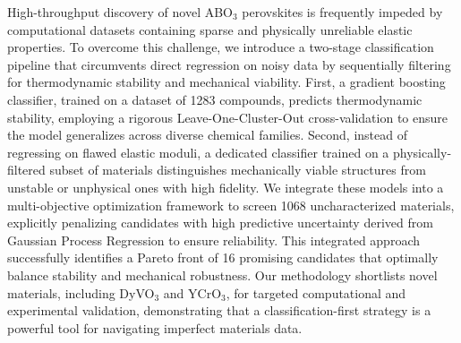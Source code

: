 \documentclass[]{article}
\begin{document}
High-throughput discovery of novel ABO$_3$ perovskites is frequently impeded by computational datasets containing sparse and physically unreliable elastic properties. To overcome this challenge, we introduce a two-stage classification pipeline that circumvents direct regression on noisy data by sequentially filtering for thermodynamic stability and mechanical viability. First, a gradient boosting classifier, trained on a dataset of 1283 compounds, predicts thermodynamic stability, employing a rigorous Leave-One-Cluster-Out cross-validation to ensure the model generalizes across diverse chemical families. Second, instead of regressing on flawed elastic moduli, a dedicated classifier trained on a physically-filtered subset of materials distinguishes mechanically viable structures from unstable or unphysical ones with high fidelity. We integrate these models into a multi-objective optimization framework to screen 1068 uncharacterized materials, explicitly penalizing candidates with high predictive uncertainty derived from Gaussian Process Regression to ensure reliability. This integrated approach successfully identifies a Pareto front of 16 promising candidates that optimally balance stability and mechanical robustness. Our methodology shortlists novel materials, including DyVO$_3$ and YCrO$_3$, for targeted computational and experimental validation, demonstrating that a classification-first strategy is a powerful tool for navigating imperfect materials data.
\end{document}
